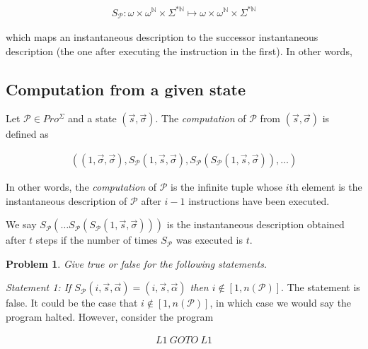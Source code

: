 \documentclass[a4paper, 12pt]{article}
\newtheorem{problem}{Problem}
\newtheorem{problem}{Problem}
\begin{document}
\begin{align*}
    S_\mathcal{P} : \omega \times \omega^{\mathbb{N}} \times
    \Sigma^{*\mathbb{N}} \mapsto  \omega \times \omega^{\mathbb{N}} \times \Sigma^{*\mathbb{N}}
\end{align*}

which maps an instantaneous description to the successor instantaneous
description (the one after executing the instruction in the first). In other
words, 

\subsection{Computation from a given state}

Let $\mathcal{P} \in Pro^{\Sigma}$ and a state  $(\overrightarrow{s},
\overrightarrow{\sigma})$. The \textit{computation} of $\mathcal{P}$ from
$(\overrightarrow{s}, \overrightarrow{\sigma})$ is defined as 

\begin{align*}
    \left(  (1, \overrightarrow{\sigma}, \overrightarrow{\sigma}),
    S_{\mathcal{P}}\left( 1, \overrightarrow{s}, \overrightarrow{\sigma}
\right), S_{\mathcal{P}} \left( S_{\mathcal{P}} \left( 1, \overrightarrow{s},
\overrightarrow{\sigma} \right)  \right), \ldots   \right) 
\end{align*}

In other words, the \textit{computation} of $\mathcal{P}$ is the infinite tuple
whose $i$th element is the instantaneous description of $\mathcal{P}$ after $i -
1$ instructions have been executed.

We say $S_{\mathcal{P}} \left( \ldots S_{\mathcal{P}} \left(
S_{\mathcal{P}}\left( 1, \overrightarrow{s}, \overrightarrow{\sigma} \right)
\right)  \right) $ is the instantaneous description obtained after $t$ steps if
the number of times $S_{\mathcal{P}}$ was executed is $t$.

\begin{problem}
    Give true or false for the following statements.
\end{problem}

\textit{Statement 1: If $S_{\mathcal{P}}(i, \overrightarrow{s},
\overrightarrow{\alpha}) = (i, \overrightarrow{s}, \overrightarrow{\alpha})$
then $i \not\in [1, n(\mathcal{P})]$}. The statement is false. It could be the
case that $i \not\in [1, n( \mathcal{P} )]$, in which case we would say the program
halted. However, consider the program 

\begin{align*}
    L1 ~ GOTO ~ L1 
\end{align*}
\end{document}
